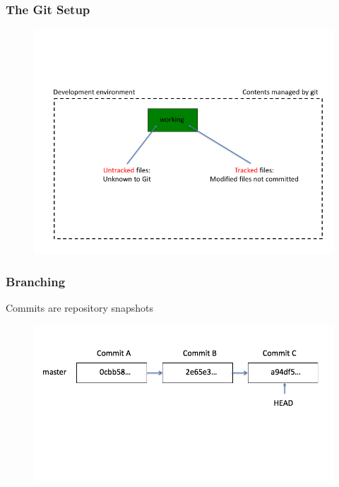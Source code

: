 \documentclass[11pt]{beamer}
\begin{document}
\begin{frame}[fragile]
\frametitle{The Git Setup}

\begin{figure}[htp]
 \centering
 \includegraphics[scale=0.35]{git_setup.png}
\end{figure}




\end{frame}



\begin{frame}[fragile]
\frametitle{Branching}
Commits are repository snapshots
\begin{figure}[htp]
 \centering
 \includegraphics[scale=0.35]{branch1.png}
\end{figure}




\end{frame}
\end{document}
